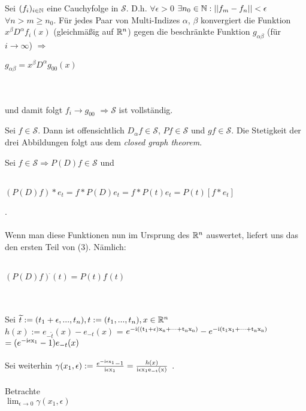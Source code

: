\documentclass{article}
\def\ie{\rm i}
\begin{document}
\begin{beweis}
	\begin{liste}
		\item Sei $(f_i)_{i \in \mathbb{N}}$ eine Cauchyfolge in $\mathcal{S}$. 
		      D.h. $\forall \epsilon > 0$ $\exists n_0 \in \mathbb{N} : || f_m - f_n || < \epsilon$ $\forall n > m \geq n_0.$
		      Für jedes Paar von Multi-Indizes $\alpha$, $\beta$ konvergiert die Funktion $x^{\beta}D^{\alpha}f_i(x)$ 
		      (gleichmäßig auf $\mathbb{R}^n$) gegen die beschränkte Funktion $g_{\alpha \beta}$ (für $i \to \infty$) $\Rightarrow$ \\
		      \centerline{ $g_{\alpha \beta} = x^{\beta} D^{\alpha} g_{00}(x)$} \\ \\
		      und damit folgt $f_i \to g_{00}$ $\Rightarrow \mathcal{S}$ ist vollständig.
		\item Sei $f \in \mathcal{S}$. Dann ist offensichtlich $D_{\alpha} f \in \mathcal{S}$, $Pf \in \mathcal{S}$ und $gf \in \mathcal{S}$. 
			  Die Stetigkeit der drei Abbildungen folgt aus dem \emph{closed graph theorem}.
		\item Sei $f \in \mathcal{S} \Rightarrow P(D)f \in \mathcal{S}$ und \\ \\
		      \centerline{$(P(D)f)*e_t = f * P(D) e_t = f * P(t) e_t = P(t)[f*e_t]$}. \\ \\
		      Wenn man diese Funktionen nun im Ursprung des $\mathbb{R}^n$ auswertet, liefert uns das den ersten Teil von (3). Nämlich: \\ \\
		      \centerline{$(P(D)f)^{\widehat{}}(t) = P(t)f^{\widehat{}}(t)$} \\ \\ 
		      Sei $\widetilde{t} := (t_1 + \epsilon,..., t_n), t := (t_1,..., t_n), x \in \mathbb{R}^n$ \\
   		      $h(x) := e_{-\widetilde{t}}(x) - e_{-t}(x)$  = $
		      e^{-\ie((t_1+\epsilon)x_n+\cdots+t_nx_n)} - e^{-\ie(t_1x_1+\cdots+t_nx_n)}$ \\ $ = 
		      (e^{-\ie \epsilon x_1}-1)e_{-t}(x)$  \\ \\
		      Sei weiterhin $\gamma(x_1,\epsilon) := \frac{e^{-\ie\epsilon x_1}-1}{\ie\epsilon x_1} = \frac{h(x)}{\ie\epsilon x_1 e_{-t}(x)}$  . \\ \\
		      Betrachte \\ $\lim_{\epsilon \to 0} \gamma(x_1,\epsilon) $ 

\end{liste}
\end{beweis}
\end{document}
